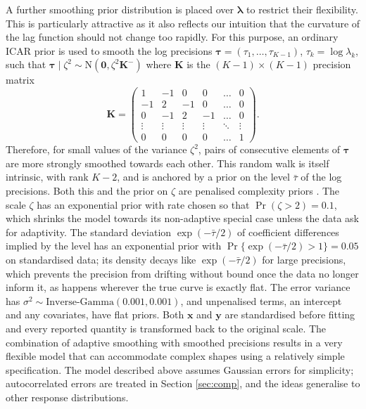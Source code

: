 \documentclass[11pt]{article}
\newcommand{\by}{\mathbf{y}}
\newcommand{\bx}{\mathbf{x}}
\newcommand{\bK}{\mathbf{K}}
\newcommand{\blambda}{\bm{\lambda}}
\newcommand{\btau}{\bm{\tau}}
\newcommand{\bzero}{\mathbf{0}}
\newcommand{\N}{\mathrm{N}}
\begin{document}
A further smoothing prior distribution is placed over $\blambda$ to restrict
their flexibility. This is particularly attractive as it also reflects our
intuition that the curvature of the lag function should not change too
rapidly. For this purpose, an ordinary ICAR prior is used to smooth the log
precisions $\btau = (\tau_1, \ldots, \tau_{K-1})$, $\tau_k = \log
\lambda_k$, such that $\btau \mid \zeta^2 \sim \N(\bzero, \zeta^2 \bK^{-})$
where $\bK$ is the $(K-1) \times (K-1)$ precision matrix
\begin{equation*}
\bK =
\begin{pmatrix}
1 & -1 & 0 & 0 & \ldots & 0 \\
-1 & 2 & -1 & 0 & \ldots & 0 \\
0 & -1 & 2 & -1 & \ldots & 0 \\
\vdots & \vdots & \vdots & \vdots & \ddots & \vdots \\
0 & 0 & 0 & 0 & \ldots & 1
\end{pmatrix}.
\end{equation*}
Therefore, for small values of the variance $\zeta^2$, pairs of consecutive
elements of $\btau$ are more strongly smoothed towards each other. This random
walk is itself intrinsic, with rank $K - 2$, and is anchored by a prior on the
level $\bar{\tau}$ of the log precisions. Both this and the prior on $\zeta$
are penalised complexity priors \citep{simpson2017}. The scale $\zeta$ has an
exponential prior with rate chosen so that $\Pr(\zeta > 2) = 0.1$, which
shrinks the model towards its non-adaptive special case unless the data ask
for adaptivity. The standard deviation $\exp(-\bar{\tau}/2)$ of coefficient
differences implied by the level has an exponential prior with
$\Pr\{\exp(-\bar{\tau}/2) > 1\} = 0.05$ on standardised data; its density
decays like $\exp(-\bar{\tau}/2)$ for large precisions, which prevents the
precision from drifting without bound once the data no longer inform it, as
happens wherever the true curve is exactly flat. The error variance has
$\sigma^2 \sim \mbox{Inverse-Gamma}(0.001, 0.001)$, and unpenalised terms,
an intercept and any covariates, have flat priors. Both $\bx$ and $\by$ are
standardised before fitting and every reported quantity is transformed back
to the original scale. The combination of adaptive smoothing with smoothed
precisions results in a very flexible model that can accommodate complex
shapes using a relatively simple specification. The model described above
assumes Gaussian errors for simplicity; autocorrelated errors are treated in
Section \ref{sec:comp}, and the ideas generalise to other response
distributions.
\end{document}
